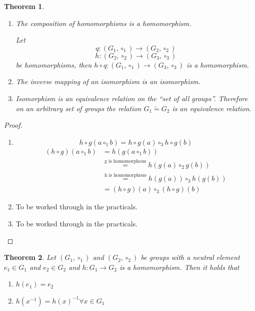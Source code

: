 \documentclass[a4paper,landscape,twocolumn]{article}
\newtheorem{theorem}{Theorem}[section]
\begin{document}
\begin{theorem}
  \begin{enumerate}
    \item
      The composition of homomorphisms is a homomorphism.

      Let
      \[ q: (G_1, \circ_1) \rightarrow (G_2, \circ_2) \]
      \[ h: (G_2, \circ_2) \rightarrow (G_3, \circ_3) \]
      be homomorphisms, then $h \circ q: (G_1, \circ_1) \rightarrow (G_3, \circ_3)$
      is a homomorphism.

    \item
      The inverse mapping of an isomorphism is an isomorphism.
    \item
      Isomorphism is an equivalence relation on the \enquote{set of all groups}.
      Therefore on an arbitrary set of groups the relation
      $G_1 \tilde{=} G_2$ is an equivalence relation.
  \end{enumerate}
\end{theorem}

\begin{proof}
  \begin{enumerate}
    \item
      \[ h \circ g(a \circ_1 b) = h \circ g(a) \circ_3 h\circ g(b) \]
      \begin{align*}
        (h \circ g)(a \circ_1 b) &= h(g(a \circ_1 b)) \\
            &\stackrel{\text{g is homomorphous}}{=} h(g(a) \circ_2 g(b)) \\
            &\stackrel{\text{h is homomorphous}}{=} h(g(a)) \circ_3 h(g(b)) \\
            &= (h \circ g)(a) \circ_3 (h \circ g)(b)
      \end{align*}
    \item To be worked through in the practicals.
    \item To be worked through in the practicals.
  \end{enumerate}
\end{proof}

\begin{theorem}
  Let $(G_1, \circ_1)$ and $(G_2, \circ_2)$ be groups with a neutral element
  $e_1 \in G_1$ and $e_2 \in G_2$ and $h: G_1 \rightarrow G_2$ is a homomorphism.
  Then it holds that
  \begin{enumerate}
    \item $h(e_1) = e_2$
    \item $h(x^{-1}) = h(x)^{-1} \forall x \in G_1$
  \end{enumerate}
\end{theorem}
\end{document}
